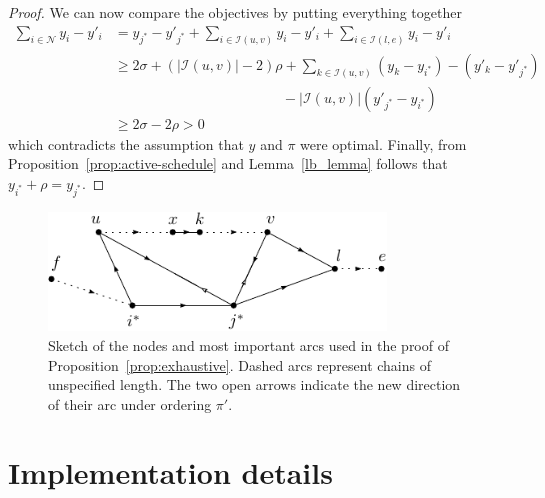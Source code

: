 \documentclass[a4paper]{article}
\theoremstyle{definition}
\theoremstyle{plain}
\begin{document}
\begin{proof}
  We can now compare the objectives by putting everything together
  \begin{align*}
    \sum_{i \in \mathcal{N}} y_{i} - y'_{i} &=  y_{j^{*}} - y'_{j^{*}} + \sum_{i \in \mathcal{I}(u, v)} y_{i} - y'_{i} + \sum_{i \in \mathcal{I}(l, e)} y_{i} - y'_{i} \\
    &\geq 2 \sigma + (|\mathcal{I}(u,v)| - 2) \rho + \sum_{k \in \mathcal{I}(u,v)} (y_{k} - y_{i^{*}}) - (y'_{k} - y'_{j^{*}}) \\ & \hspace{12em} - |\mathcal{I}(u,v)| (y'_{j^{*}} - y_{i^{*}}) \\
    &\geq 2 \sigma - 2 \rho > 0
  \end{align*}
  which contradicts the assumption that $y$ and $\pi$ were optimal.
  Finally, from Proposition~\ref{prop:active-schedule} and Lemma~\ref{lb_lemma}
  follows that $y_{i^{*}} + \rho = y_{j^{*}}$.
\end{proof}

\begin{figure}[H]
  \centering
  \includegraphics[width=0.8\textwidth]{figures/single/platoon-preservation-proof-diagram.pdf}
  \caption{Sketch of the nodes and most important arcs used in the proof of
    Proposition~\ref{prop:exhaustive}. Dashed arcs represent chains of
    unspecified length. The two open arrows indicate the new direction of their
    arc under ordering $\pi'$.}\label{fig:platoon-preservation-diagram}
\end{figure}


\section{Implementation details}
\end{document}

